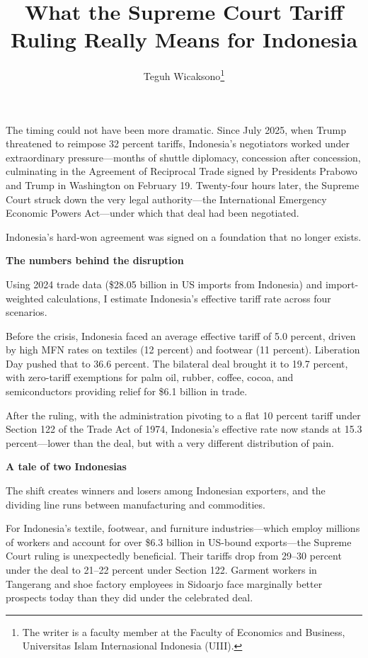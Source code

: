 \documentclass[12pt,a4paper]{article}
\title{\textbf{What the Supreme Court Tariff Ruling Really Means for Indonesia}}
\author{Teguh Wicaksono\thanks{The writer is a faculty member at the Faculty of Economics and Business, Universitas Islam Internasional Indonesia (UIII).}}
\date{}
\begin{document}
\maketitle
\thispagestyle{empty}

\onehalfspacing

The timing could not have been more dramatic. Since July 2025, when Trump threatened to reimpose 32 percent tariffs, Indonesia's negotiators worked under extraordinary pressure---months of shuttle diplomacy, concession after concession, culminating in the Agreement of Reciprocal Trade signed by Presidents Prabowo and Trump in Washington on February 19. Twenty-four hours later, the Supreme Court struck down the very legal authority---the International Emergency Economic Powers Act---under which that deal had been negotiated.

Indonesia's hard-won agreement was signed on a foundation that no longer exists.

\bigskip
\noindent\textbf{The numbers behind the disruption}

\medskip
Using 2024 trade data (\$28.05 billion in US imports from Indonesia) and import-weighted calculations, I estimate Indonesia's effective tariff rate across four scenarios.

Before the crisis, Indonesia faced an average effective tariff of 5.0 percent, driven by high MFN rates on textiles (12 percent) and footwear (11 percent). Liberation Day pushed that to 36.6 percent. The bilateral deal brought it to 19.7 percent, with zero-tariff exemptions for palm oil, rubber, coffee, cocoa, and semiconductors providing relief for \$6.1 billion in trade.

After the ruling, with the administration pivoting to a flat 10 percent tariff under Section 122 of the Trade Act of 1974, Indonesia's effective rate now stands at 15.3 percent---lower than the deal, but with a very different distribution of pain.

\bigskip
\noindent\textbf{A tale of two Indonesias}

\medskip
The shift creates winners and losers among Indonesian exporters, and the dividing line runs between manufacturing and commodities.

For Indonesia's textile, footwear, and furniture industries---which employ millions of workers and account for over \$6.3 billion in US-bound exports---the Supreme Court ruling is unexpectedly beneficial. Their tariffs drop from 29--30 percent under the deal to 21--22 percent under Section 122. Garment workers in Tangerang and shoe factory employees in Sidoarjo face marginally better prospects today than they did under the celebrated deal.
\end{document}
